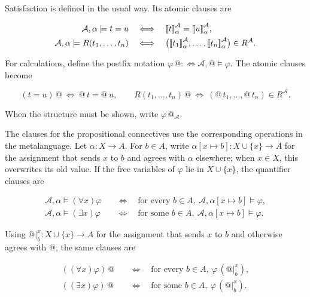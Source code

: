 \documentclass[11pt]{article}
\makeatletter
\newcommand{\llbracket}{\mathopen{[\mkern-3mu[}}
\newcommand{\rrbracket}{\mathclose{]\mkern-3mu]}}
\newcommand{\atsign}{\mathord{@}}
\makeatother
\begin{document}
Satisfaction is defined in the usual way. Its atomic clauses are

\[
\begin{aligned}
\mathcal A,\alpha\models t=u
&\quad\Longleftrightarrow\quad
\llbracket t\rrbracket^{\mathcal A}_\alpha
=\llbracket u\rrbracket^{\mathcal A}_\alpha,\\
\mathcal A,\alpha\models R(t_1,\ldots,t_n)
&\quad\Longleftrightarrow\quad
\bigl(\llbracket t_1\rrbracket^{\mathcal A}_\alpha,\ldots,
\llbracket t_n\rrbracket^{\mathcal A}_\alpha\bigr)
\in R^{\mathcal A}.
\end{aligned}
\]

For calculations, define the postfix notation
\(\varphi\,\atsign:\!\Longleftrightarrow
\mathcal A,\atsign\models\varphi\). The atomic clauses become

\[
(t=u)\,\atsign\ \Longleftrightarrow\ \atsign\,t=\atsign\,u,
\qquad
R(t_1,\ldots,t_n)\,\atsign\ \Longleftrightarrow\ 
(\atsign\,t_1,\ldots,\atsign\,t_n)\in R^{\mathcal A}.
\]

When the structure must be shown, write
\(\varphi\,\atsign_{\mathcal A}\).

The clauses for the propositional connectives use the corresponding
operations in the metalanguage. Let \(\alpha:X\to A\). For \(b\in A\), write
\(\alpha[x\mapsto b]:X\cup\{x\}\to A\) for the assignment that sends
\(x\) to \(b\) and agrees with \(\alpha\) elsewhere; when \(x\in X\), this
overwrites its old value. If the free variables of \(\varphi\) lie in
\(X\cup\{x\}\), the quantifier clauses are

\[
\begin{aligned}
\mathcal A,\alpha\models(\forall x)\varphi
&\quad\Longleftrightarrow\quad
\text{for every }b\in A,
\ \mathcal A,\alpha[x\mapsto b]\models\varphi,\\
\mathcal A,\alpha\models(\exists x)\varphi
&\quad\Longleftrightarrow\quad
\text{for some }b\in A,
\ \mathcal A,\alpha[x\mapsto b]\models\varphi.
\end{aligned}
\]

Using \(\atsign\vert_b^x:X\cup\{x\}\to A\) for the assignment that sends
\(x\) to \(b\) and otherwise agrees with \(\atsign\), the same clauses are

\[
\begin{aligned}
((\forall x)\varphi)\,\atsign
&\quad\Longleftrightarrow\quad
\text{for every }b\in A,\ \varphi\,(\atsign\vert_b^x),\\
((\exists x)\varphi)\,\atsign
&\quad\Longleftrightarrow\quad
\text{for some }b\in A,\ \varphi\,(\atsign\vert_b^x).
\end{aligned}
\]
\end{document}
